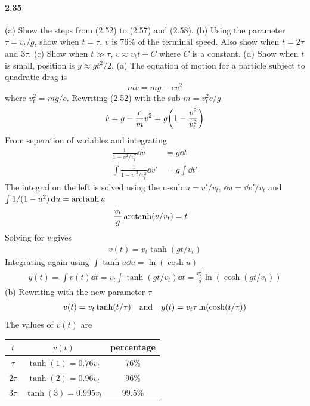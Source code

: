 \documentclass[../problems.tex]{subfiles}
\begin{document}
\paragraph{2.35} (a) Show the steps from (2.52) to (2.57) and (2.58). (b) Using the parameter
$\tau=v_t/g$, show when $t=\tau$, $v$ is 76\% of the terminal speed. Also show when $t = 2\tau$ and
$3\tau$. (c) Show when $t\gg\tau$, $v\approx v_t t + C$ where $C$ is a constant. (d) Show when $t$
is small, position is $y\approx g t^2/2$.
\barh 
(a) The equation of motion for a particle subject to quadratic drag is
\begin{equation*} \tag{2.52}
    m \dot{v} = mg - cv^2
\end{equation*}
where $v_t^2 = mg/c$. Rewriting (2.52) with the sub $m=v_t^2c/g$
\begin{align*}
    \dot{v} = g - \frac{c}{m} v^2 = g \quantity(1 - \frac{v^2}{v_t^2})
\end{align*}
From seperation of variables and integrating
\begin{align*}
    \frac{1}{1 - v^2/v_t^2}\dd{v} &= g \dd{t} \\
    \int \frac{1}{1 - v'^2/v_t^2}\dd{v'} &= g \int \dd{t'}
\end{align*}
The integral on the left is solved using the u-sub $u = v'/v_t$, $\dd{u} = \dd{v'}/v_t$ and 
$\int 1/(1-u^2) \dd{u}= \operatorname{arctanh} u$
\begin{align*}
    \frac{v_t}{g} \operatorname{arctanh}(v/v_t) &= t
\end{align*}
Solving for $v$ gives
\begin{align*}
    v(t) = v_t \tanh(gt/v_t)
\end{align*}
Integrating again using $\int \tanh u \dd{u} = \ln(\cosh u)$
\begin{align*}
    y(t) = \int v(t) \dd{t} = v_t\int \tanh(gt/v_t) \dd{t} = \frac{v_t^2}{g} \ln(\cosh(gt/v_t))
\end{align*}
(b) Rewriting with the new parameter $\tau$
\begin{align*}
    v(t) = v_t \tanh(t/\tau) \qand y(t) = v_t\tau \ln(\cosh(t/\tau))
\end{align*}
The values of $v(t)$ are
\begin{center}
    \begin{tabular}{c c c}
        $t$ & $v(t)$ & percentage\\
        \hline
        $\tau$ & $\tanh(1)=0.76v_t$ & 76\%\\
        $2\tau$ & $\tanh(2)=0.96v_t$ & 96\%\\
        $3\tau$ & $\tanh(3)=0.995v_t$ & 99.5\%
    \end{tabular}
\end{center}
\end{document}
